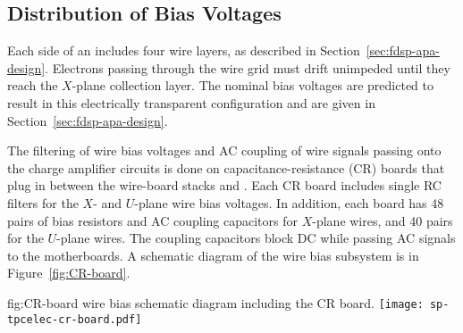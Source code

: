 \subsection{Distribution of Bias Voltages}
\label{sec:fdsp-tpcelec-design-bias}


Each side of an  includes four wire layers, as described in Section~\ref{sec:fdsp-apa-design}. 
Electrons passing through the wire grid must drift unimpeded until they reach the $X$-plane 
collection layer. The nominal bias voltages are predicted to result in this electrically 
transparent configuration and are given in Section~\ref{sec:fdsp-apa-design}. 

The filtering of wire bias voltages and AC  coupling of wire signals passing
onto the charge amplifier circuits is done on capacitance-resistance (CR)  boards that plug in between the  wire-board stacks and .
Each CR board includes single RC filters for the $X$- and $U$-plane wire bias voltages. In addition, each board has \num{48} 
pairs of bias resistors and AC coupling capacitors for $X$-plane wires, and \num{40} pairs for the $U$-plane wires. The coupling capacitors block DC while passing AC 
signals to the  motherboards.  A schematic diagram of the   wire bias subsystem is in Figure~\ref{fig:CR-board}.

\begin{dunefigure}
{fig:CR-board}
{  wire bias schematic diagram including the CR board.}
\texttt{[image: sp-tpcelec-cr-board.pdf]}
\end{dunefigure}

